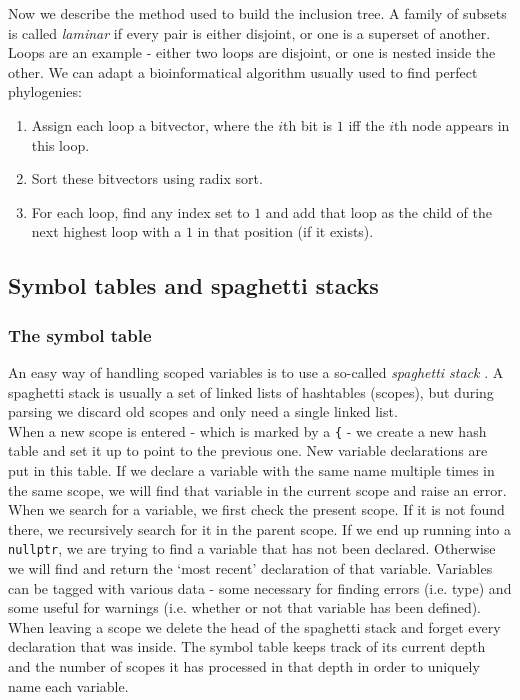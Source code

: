 \documentclass[12pt,a4paper]{article}
\begin{document}
\begin{enumerate}
Now we describe the method used to build the inclusion tree. A family of subsets is called \emph{laminar} if every pair is either disjoint,
or one is a superset of another. Loops are an example - either two loops are disjoint, or one is nested inside
the other. We can adapt a bioinformatical algorithm usually used to find perfect phylogenies\cite{gusfield}:

\begin{enumerate}
\item Assign each loop a bitvector, where the $i$th bit is $1$ iff the $i$th node appears in this loop.
\item Sort these bitvectors using radix sort.
\item For each loop, find any index set to $1$ and add that loop as the child of the next highest loop with a $1$ in that position (if it exists).
\end{enumerate}

\subsection{Symbol tables and spaghetti stacks} \label{app:spaghetti}
\subsubsection{The symbol table}
An easy way of handling scoped variables is to use a so-called \textit{spaghetti stack} \citep{dragon}. A spaghetti stack is usually a set of linked lists of hashtables (scopes), but during parsing we discard old scopes and only need a single linked list.\\
When a new scope is entered - which is marked by a \texttt{\{} - we create a new hash table and set it up to point to the previous one. New variable declarations are put in this table. If we declare a variable with the same name multiple times in the same scope, we will find that variable in the current scope and raise an error.\\
When we search for a variable, we first check the present scope. If it is not found there, we recursively search for it in the parent scope. If we end up running into a \texttt{nullptr}, we are trying to find a variable that has not been declared. Otherwise we will find and return the `most recent' declaration of that variable. Variables can be tagged with various data - some necessary for finding errors (i.e. type) and some useful for warnings (i.e. whether or not that variable has been defined).\\
When leaving a scope we delete the head of the spaghetti stack and forget every declaration that was inside. The symbol table keeps track of its current depth and the number of scopes it has processed in that depth in order to uniquely name each variable.


\end{enumerate}
\end{document}
